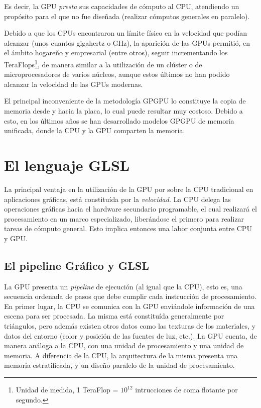Es decir, la GPU {\em presta} sus capacidades de cómputo al CPU, atendiendo un propósito para el que no fue diseñada (realizar cómputos generales en paralelo).

Debido a que los CPUs encontraron un límite físico en la velocidad que podían alcanzar (unos cuantos gigahertz o GHz), la aparición de las GPUs permitió, en el ámbito hogareño y empresarial (entre otros), seguir incrementando los TeraFlops\footnote{Unidad de medida, 1 TeraFlop = $10^{12}$ intrucciones de coma flotante por segundo.}, de manera similar a la utilización de un clúster o de microprocesadores de varios núcleos, aunque estos últimos no han podido alcanzar la velocidad de las GPUs modernas.

El principal inconveniente de la metodología GPGPU lo constituye la copia de memoria desde y hacia la placa, lo cual puede resultar muy costoso.
Debido a esto, en los últimos años se han desarrollado modelos GPGPU de memoria unificada, donde la CPU y la GPU comparten la memoria.



\section{El lenguaje GLSL}
La principal ventaja en la utilización de la GPU por sobre la CPU tradicional en aplicaciones gráficas, está constituída por la {\em velocidad}.
La CPU delega las operaciones gr\'aficas hacia el hardware secundario programable, el cual realizar\'a el procesamiento en un marco especializado, liberándose el primero para realizar tareas de cómputo general.
Esto implica entonces una labor conjunta entre CPU y GPU.


\subsection{El pipeline Gráfico y GLSL}
La GPU presenta un {\em pipeline} de ejecución (al igual que la CPU), esto es, una secuencia ordenada de pasos que debe cumplir cada instrucci\'on de procesamiento.
En primer lugar, la CPU se comunica con la GPU enviándole información de una escena para ser procesada.
La misma está constituída generalmente por triángulos, pero además existen otros datos como las texturas de los materiales, y datos del entorno (color y posición de las fuentes de luz, etc.).
La GPU cuenta, de manera análoga a la CPU, con una unidad de procesamiento y una unidad de memoria.
A diferencia de la CPU, la arquitectura de la misma presenta una memoria estratificada, y un diseño paralelo de la unidad de procesamiento.

